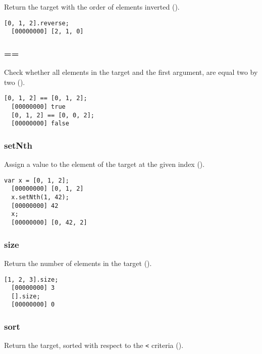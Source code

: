 Return the target with the order of elements inverted
().

\begin{lstlisting}[caption=List.reverse, label=lst:list-reverse, float=\floatposh]
  [0, 1, 2].reverse;
  [00000000] [2, 1, 0]
\end{lstlisting}

\subsubsection{==}

Check whether all elements in the target and the first argument, are
equal two by two ().

\begin{lstlisting}[caption={List.==}, label=lst:list-sameAs, float=\floatposh]
  [0, 1, 2] == [0, 1, 2];
  [00000000] true
  [0, 1, 2] == [0, 0, 2];
  [00000000] false
\end{lstlisting}

\subsubsection{setNth}
\label{sect:std-list-setnth}

Assign a value to the element of the target at the given index
().

\begin{lstlisting}[caption=List.setNth, label=lst:list-setNth, float=\floatposh]
  var x = [0, 1, 2];
  [00000000] [0, 1, 2]
  x.setNth(1, 42);
  [00000000] 42
  x;
  [00000000] [0, 42, 2]
\end{lstlisting}

\subsubsection{size}

Return the number of elements in the target ().

\begin{lstlisting}[caption=List.size, label=lst:list-size, float=\floatposh]
  [1, 2, 3].size;
  [00000000] 3
  [].size;
  [00000000] 0
\end{lstlisting}

\subsubsection{sort}

Return the target, sorted with respect to the \lstinline|<| criteria
().


